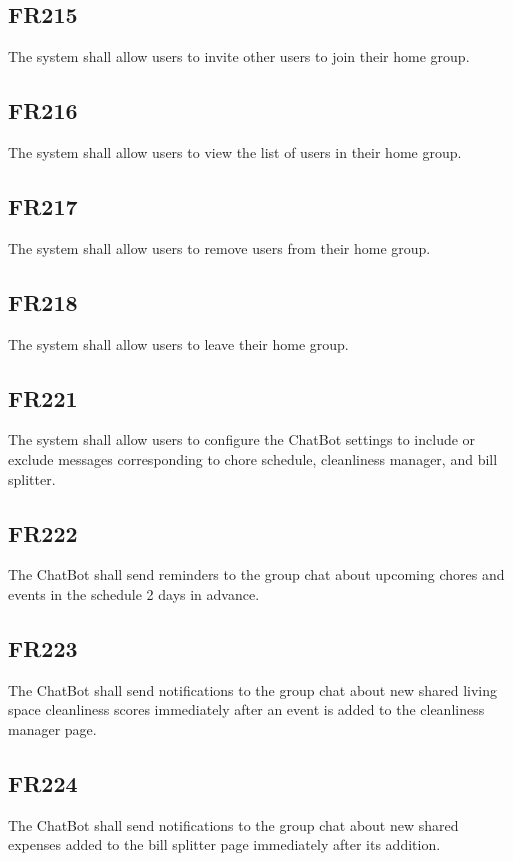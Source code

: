 \documentclass[12pt, titlepage]{article}
\begin{document}
\subsection{FR215}
The system shall allow users to invite other users to join their home group.

\subsection{FR216}
The system shall allow users to view the list of users in their home group.

\subsection{FR217}
The system shall allow users to remove users from their home
group.

\subsection{FR218}
The system shall allow users to leave their home group.

\subsection{FR221}
The system shall allow users to configure the ChatBot settings to
include or exclude messages corresponding to chore schedule, cleanliness
manager, and bill splitter.

\subsection{FR222}
The ChatBot shall send reminders to the group chat about
upcoming chores and events in the schedule 2 days in advance.

\subsection{FR223}
The ChatBot shall send notifications to the group chat about new
shared living space cleanliness scores immediately after an event is added to
the cleanliness manager page.

\subsection{FR224}
The ChatBot shall send notifications to the group chat about new
shared expenses added to the bill splitter page immediately after its
addition.
\end{document}
